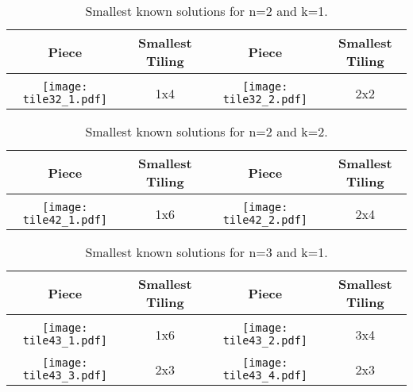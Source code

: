 \documentclass[10pt,a4paper]{article}
\theoremstyle{definition}
\begin{document}
\begin{table}[!htpb]
\centering
\begin{tabular}{|c|c|c|c|}
\hline
Piece & Smallest Tiling & Piece & Smallest Tiling\\ \hline
& & & \\ 
\texttt{[image: tile32\_1.pdf]} & 1x4 & \texttt{[image: tile32\_2.pdf]} & 2x2 \\ \hline
\end{tabular}
\caption{Smallest known solutions for n=2 and k=1.}
\label{tab:trivial-21}
\end{table}

\begin{table}[!htpb]
\centering
\begin{tabular}{|c|c|c|c|}
\hline
Piece & Smallest Tiling & Piece & Smallest Tiling\\ \hline
& & & \\ 
\texttt{[image: tile42\_1.pdf]} & 1x6 & \texttt{[image: tile42\_2.pdf]} & 2x4 \\ \hline
\end{tabular}
\caption{Smallest known solutions for n=2 and k=2.}
\label{tab:trivial-22}
\end{table}

\begin{table}[!htpb]
\centering
\begin{tabular}{|c|c|c|c|}
\hline
Piece & Smallest Tiling & Piece & Smallest Tiling\\ \hline
& & & \\ 
\texttt{[image: tile43\_1.pdf]} & 1x6 & \texttt{[image: tile43\_2.pdf]} & 3x4 \\ \hline
& & & \\ 
\texttt{[image: tile43\_3.pdf]} & 2x3 & \texttt{[image: tile43\_4.pdf]} & 2x3 \\ \hline
\end{tabular}
\caption{Smallest known solutions for n=3 and k=1.}
\label{tab:trivial-31}
\end{table}
\end{document}
